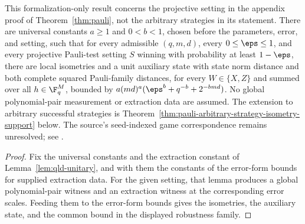 \begin{theorem}
  \label{thm:pauli-projective-setting-isometry-support}
  \leanok
  This formalization-only result concerns the projective setting in the
  appendix proof of Theorem~\ref{thm:pauli}, not the arbitrary strategies in
  its statement. There are universal constants $a\geq1$ and $0<b<1$, chosen
  before the parameters, error, and setting, such that for every admissible
  $(q,m,d)$, every $0\leq\eps\leq1$, and every projective Pauli-test setting
  $S$ winning with probability at least $1-\eps$, there are local isometries
  and a unit auxiliary state
  with state norm distance and both complete squared Pauli-family distances,
  for every $W\in\{X,Z\}$ and summed over all $h\in\F_q^M$, bounded by
  $a(md)^a(\eps^b+q^{-b}+2^{-bmd})$. No global polynomial-pair measurement
  or extraction data are assumed. The extension to arbitrary successful
  strategies is Theorem~\ref{thm:pauli-arbitrary-strategy-isometry-support}
  below. The source's seed-indexed game correspondence remains unresolved;
  see \cite{gap:qpbt_ld-dimension-divisibility}.
\end{theorem}
\begin{proof}
  \leanok
  Fix the universal constants and the extraction constant of
  Lemma~\ref{lem:qld-unitary}, and with them the constants of the error-form
  bounds for supplied extraction data. For the given setting, that lemma
  produces a global polynomial-pair witness and an extraction witness at the
  corresponding error scales. Feeding them to the error-form bounds gives the
  isometries, the auxiliary state, and the common bound in the displayed
  robustness family.
\end{proof}

